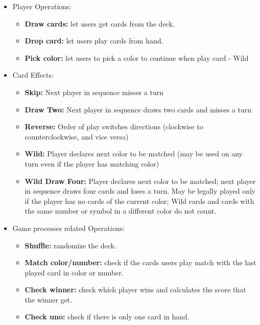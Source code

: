 \documentclass[letterpaper,12pt,fleqn]{article}
\begin{document}
\begin{itemize}
\setlength{\itemsep}{0em}
	\item Player Operations:
	\begin{itemize}
	\setlength{\itemsep}{0em}
		\item \textbf{Draw cards:} let users get cards from the deck.
		\item \textbf{Drop card:}  let users play cards from hand.
		\item \textbf{Pick color:} let users to pick a color to continue when play card - Wild
	\end{itemize}

	\item Card Effects:
	\begin{itemize}
	\setlength{\itemsep}{0em}
		\item \textbf{Skip:} Next player in sequence misses a turn
		\item \textbf{Draw Two:} Next player in sequence draws two cards and misses a turn
		\item \textbf{Reverse:} Order of play switches directions (clockwise to counterclockwise, and vice versa)
		\item \textbf{Wild:} Player declares next color to be matched (may be used on any turn even if the player has matching color)
		\item \textbf{Wild Draw Four:} Player declares next color to be matched; next player in sequence draws four cards and loses a turn. May be legally played only if the player has no cards of the current color; Wild cards and cards with the same number or symbol in a different color do not count.
	\end{itemize}

	\item Game processes related Operations:
	\begin{itemize}
	\setlength{\itemsep}{0em}
		\item \textbf{Shuffle:} randomize the deck.
		\item \textbf{Match color/number:} check if the cards users play match with the last played card in color or number.
		\item \textbf{Check winner:} check which player wins and calculates the score that the winner get.
		\item \textbf{Check uno:} check if there is only one card in hand.
	\end{itemize}
	
\end{itemize}
\end{document}
